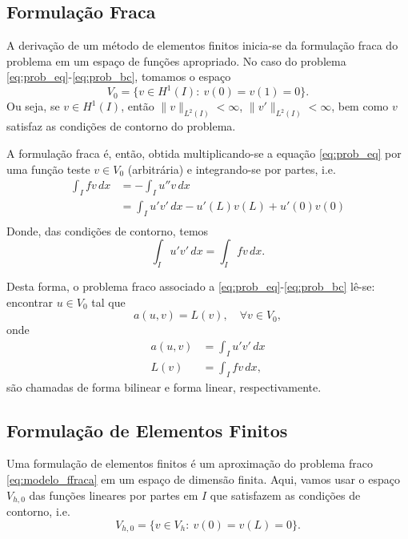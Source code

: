 \subsection{Formulação Fraca}
\badgeRevisar

A derivação de um método de elementos finitos inicia-se da formulação fraca do problema em um espaço de funções apropriado. No caso do problema \eqref{eq:prob_eq}-\eqref{eq:prob_bc}, tomamos o espaço
\begin{equation}
  V_0 = \{v\in H^1(I):~v(0)=v(1)=0\}.
\end{equation}
Ou seja, se $v\in H^1(I)$, então $\|v\|_{L^2(I)}<\infty$, $\|v'\|_{L^2(I)}<\infty$, bem como $v$ satisfaz as condições de contorno do problema.

A formulação fraca é, então, obtida multiplicando-se a equação \eqref{eq:prob_eq} por uma função teste $v\in V_0$ (arbitrária) e integrando-se por partes, i.e.
\begin{align}
  \int_I fv\,dx &= -\int_I u''v\,dx\\
  &= \int_I u'v'\,dx - u'(L)v(L) + u'(0)v(0)\\
\end{align}
Donde, das condições de contorno, temos
\begin{equation}
  \int_I u'v'\,dx = \int_I fv\,dx.
\end{equation}

Desta forma, o problema fraco associado a \eqref{eq:prob_eq}-\eqref{eq:prob_bc} lê-se: encontrar $u\in V_0$ tal que
\begin{equation}\label{eq:modelo_ffraca}
  a(u,v) = L(v),\quad\forall v\in V_0,
\end{equation}
onde
\begin{align}
  a(u,v) &= \int_I u'v'\,dx\label{eq:modelo_fbilinear}\\
  L(v) &= \int_I fv\,dx,\label{eq:modelo_flinear}
\end{align}
são chamadas de forma bilinear e forma linear, respectivamente.

\subsection{Formulação de Elementos Finitos}
\badgeRevisar

Uma formulação de elementos finitos é um aproximação do problema fraco \eqref{eq:modelo_ffraca} em um espaço de dimensão finita. Aqui, vamos usar o espaço $V_{h,0}$ das funções lineares por partes em $I$ que satisfazem as condições de contorno, i.e.
\begin{equation}
  V_{h,0} = \{v\in V_h:~v(0)=v(L)=0\}.
\end{equation}

